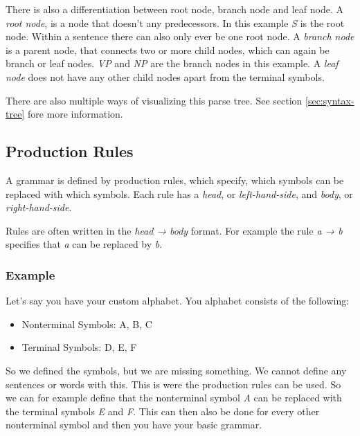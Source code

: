 There is also a differentiation between root node, branch node and leaf node. A \textit{root node}, is a node that doesn't any predecessors. In this example \textit{S} is the root node. Within a sentence there can also only ever be one root node. A \textit{branch node} is a parent node, that connects two or more child nodes, which can again be branch or leaf nodes. \textit{VP} and \textit{NP} are the branch nodes in this example. A \textit{leaf node} does not have any other child nodes apart from the terminal symbols. 

There are also multiple ways of visualizing this parse tree. See section \ref{sec:syntax-tree} fore more information.




\subsection{Production Rules}
\label{sec:production-rules}

A grammar is defined by production rules, which specify, which symbols can be replaced with which symbols. Each rule has a \textit{head}, or \textit{left-hand-side}, and \textit{body}, or \textit{right-hand-side}. 

Rules are often written in the \textit{head → body} format. For example the rule \textit{a → b} specifies that \textit{a} can be replaced by \textit{b}. 

\subsubsection{Example}

Let's say you have your custom alphabet. You alphabet consists of the following: 

\begin{itemize}
    \item Nonterminal Symbols: A, B, C
    \item Terminal Symbols: D, E, F
\end{itemize}

So we defined the symbols, but we are missing something. We cannot define any sentences or words with this. This is were the production rules can be used. So we can for example define that the nonterminal symbol \textit{A} can be replaced with the terminal symbols \textit{E} and \textit{F}. This can then also be done for every other nonterminal symbol and then you have your basic grammar. 

